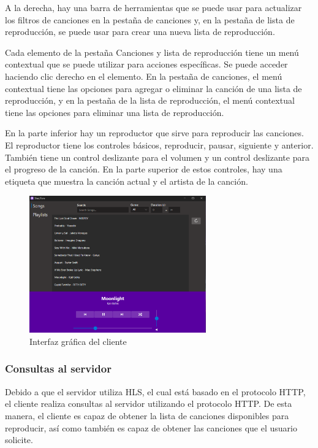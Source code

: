 A la derecha, hay una barra de herramientas que se puede usar para actualizar
los filtros de canciones en la pestaña de canciones y, en la pestaña de lista de
reproducción, se puede usar para crear una nueva lista de reproducción.

Cada elemento de la pestaña Canciones y lista de reproducción tiene un menú
contextual que se puede utilizar para acciones específicas. Se puede acceder
haciendo clic derecho en el elemento. En la pestaña de canciones, el menú
contextual tiene las opciones para agregar o eliminar la canción de una lista de
reproducción, y en la pestaña de la lista de reproducción, el menú contextual
tiene las opciones para eliminar una lista de reproducción.

En la parte inferior hay un reproductor que sirve para reproducir las canciones.
El reproductor tiene los controles básicos, reproducir, pausar, siguiente y
anterior. También tiene un control deslizante para el volumen y un control
deslizante para el progreso de la canción. En la parte superior de estos
controles, hay una etiqueta que muestra la canción actual y el artista de la
canción.

\begin{figure}
    \centering
    \includegraphics[width=3in]{assets/app.png}
    \caption{Interfaz gráfica del cliente}
    \label{fig:app}
\end{figure}

\subsubsection{Consultas al servidor}

Debido a que el servidor utiliza HLS, el cual está basado en el protocolo HTTP,
el cliente realiza consultas al servidor utilizando el protocolo HTTP. De esta
manera, el cliente es capaz de obtener la lista de canciones disponibles para
reproducir, así como también es capaz de obtener las canciones que el usuario
solicite.

